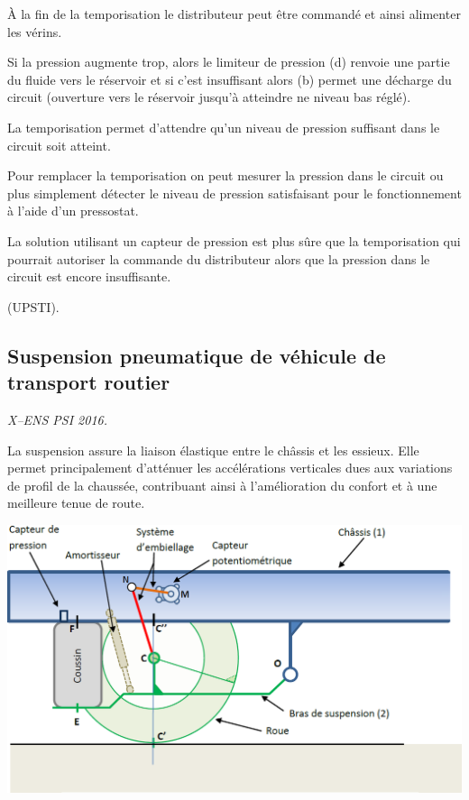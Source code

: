 \documentclass[10pt,fleqn]{article} %
\begin{document}
\begin{multicols}{2}
\begin{corrige}
À la fin de la temporisation le distributeur peut être commandé et ainsi alimenter les vérins.

Si la pression augmente trop, alors le limiteur de pression (d) renvoie une partie du fluide vers le
réservoir et si c’est insuffisant alors (b) permet une décharge du circuit (ouverture vers le réservoir
jusqu’à atteindre ne niveau bas réglé).

La temporisation permet d’attendre qu’un niveau de pression suffisant dans le circuit soit atteint.

Pour remplacer la temporisation on peut mesurer la pression dans le circuit ou plus simplement détecter
le niveau de pression satisfaisant pour le fonctionnement à l’aide d’un pressostat.

La solution utilisant un capteur de pression est plus sûre que la temporisation qui pourrait autoriser la
commande du distributeur alors que la pression dans le circuit est encore insuffisante.

(UPSTI). 
\end{corrige}
\else
\fi


\subsection*{Suspension pneumatique de véhicule de transport routier}
\setcounter{exo}{0}
\begin{flushright}
\textit{X--ENS PSI 2016.}
\end{flushright}

\ifprof
\else
La suspension assure la liaison élastique entre le châssis et les essieux. Elle permet principalement d’atténuer les accélérations verticales dues aux variations de profil de la chaussée, contribuant ainsi à l’amélioration du confort et à une meilleure tenue de route.

\begin{center}
\includegraphics[width=\linewidth]{images/fig_06}
\end{center}


\end{multicols}
\end{document}
